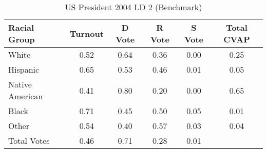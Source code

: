 \begin{table}[htb]
\begin{center}
\caption{US President 2004 LD 2 (Benchmark)}
\label{pres04_cvap_ld_2_benchmark}
\begin{tabular}{lccccc}
  \hline
Racial Group & Turnout & D Vote & R Vote & S Vote & Total CVAP \\ 
  \hline
White & 0.52 & 0.64 & 0.36 & 0.00 & 0.25 \\ 
  Hispanic & 0.65 & 0.53 & 0.46 & 0.01 & 0.05 \\ 
  Native American & 0.41 & 0.80 & 0.20 & 0.00 & 0.65 \\ 
  Black & 0.71 & 0.45 & 0.50 & 0.05 & 0.01 \\ 
  Other & 0.54 & 0.40 & 0.57 & 0.03 & 0.04 \\ 
  Total Votes & 0.46 & 0.71 & 0.28 & 0.01 &  \\ 
   \hline
\end{tabular}
\end{center}
\end{table}

